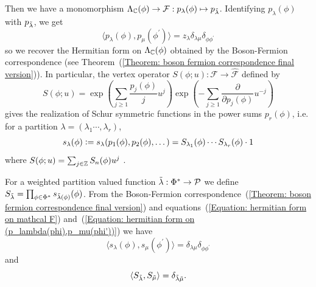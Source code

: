 Then we have a monomorphism $\Lambda_{\mathbb{C}}(\phi)\rightarrow\mathcal{F}: p_\lambda(\phi)\mapsto p_{\Tilde{\lambda}}$. Identifying $p_\lambda(\phi)$ with $p_{\Tilde{\lambda}}$, we get
\begin{equation}\label{Equation: hermitian form on (p_lambda(phi),p_mu(phi'))}
    \langle p_\lambda(\phi), p_\mu(\phi^\prime) \rangle = z_\lambda\delta_{\lambda\mu}\delta_{\phi\phi^\prime}
\end{equation}
so we recover the Hermitian form on $\Lambda_{\mathbb{C}}(\phi)$ obtained by the Boson-Fermion correspondence (see Theorem~(\ref{Theorem: boson fermion correspondence final version})). In particular, the vertex operator $S(\phi;u):\mathcal{F}\rightarrow \hat{\mathcal{F}}$ defined by
\begin{equation}\label{Equation: vertex operator for Schur}
     S(\phi;u) = \exp\left(\sum_{j\geq1}\frac{p_j(\phi)}{j}u^j\right)\exp\left(-\sum_{j\geq1}\frac{\partial}{\partial p_j(\phi)}u^{-j}\right)
\end{equation}
gives the realization of Schur symmetric functions in the power sums $p_r(\phi)$, i.e. for a partition $\lambda =(\lambda_1\cdots, \lambda_r)$,
\begin{equation}
   s_\lambda(\phi)\bydef s_\lambda(p_1(\phi),p_2(\phi),\dots)=S_{\lambda_1}(\phi)\cdots S_{\lambda_r}(\phi)\cdot 1
\end{equation}
where $S(\phi;u)=\sum_{j\in\mathbb{Z}}S_n(\phi)u^j$ .\par

For a weighted partition valued function $\Tilde{\lambda}:\Phi^*\rightarrow \mathcal{P}$ we define $S_{\Tilde{\lambda}}=\prod_{\phi\in\Phi^*} s_{\Tilde{\lambda}(\phi)}(\phi)$. From the Boson-Fermion correspondence~(\ref{Theorem: boson fermion correspondence final version}) and equations~(\ref{Equation: hermitian form on mathcal F}) and~(\ref{Equation: hermitian form on (p_lambda(phi),p_mu(phi'))}) we have
\begin{equation}
    \langle s_\lambda(\phi),s_\mu(\phi^\prime) \rangle = \delta_{\lambda\mu}\delta_{\phi\phi^\prime}
\end{equation}
and
\begin{equation}\label{Equation: orthonormality of S_tlambda}
    \langle S_{\Tilde{\lambda}},S_{\Tilde{\mu}}\rangle = \delta_{\Tilde{\lambda}\Tilde{\mu}}.
\end{equation}

